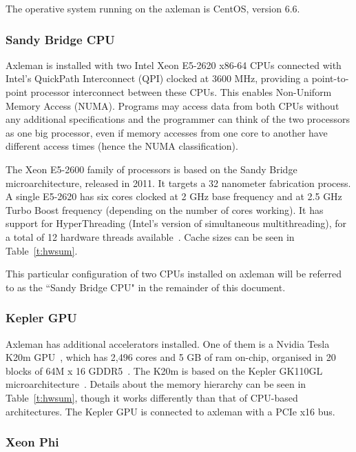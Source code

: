 The operative system running on the axleman is CentOS, version 6.6.

\subsubsection{Sandy Bridge CPU}

Axleman is installed with two Intel Xeon E5-2620 x86-64 CPUs connected with Intel's QuickPath Interconnect (QPI) clocked at 3600 MHz, providing a point-to-point processor interconnect between these CPUs. This enables Non-Uniform Memory Access (NUMA). Programs may access data from both CPUs without any additional specifications and the programmer can think of the two processors as one big processor, even if memory accesses from one core to another have different access times (hence the NUMA classification).

The Xeon E5-2600 family of processors is based on the Sandy Bridge microarchitecture, released in 2011. It targets a 32 nanometer fabrication process. A single E5-2620 has six cores clocked at 2 GHz base frequency and at 2.5 GHz Turbo Boost frequency (depending on the number of cores working). It has support for HyperThreading (Intel's version of simultaneous multithreading), for a total of 12 hardware threads available~\cite{1_cpu-world.com_2015}. Cache sizes can be seen in Table~\ref{t:hwsum}.

This particular configuration of two CPUs installed on axleman will be referred to as the ``Sandy Bridge CPU" in the remainder of this document.

\subsubsection{Kepler GPU}

Axleman has additional accelerators installed. One of them is a Nvidia Tesla K20m GPU~\cite{6_gpuzoo.com_2015}, which has 2,496 cores and 5 GB of ram on-chip, organised in 20 blocks of 64M x 16 GDDR5~\cite{Nvidia2013}. The K20m is based on the Kepler GK110GL microarchitecture~\cite{Nvidia2012}. Details about the memory hierarchy can be seen in Table~\ref{t:hwsum}, though it works differently than that of CPU-based architectures. The Kepler GPU is connected to axleman with a PCIe x16 bus.

\subsubsection{Xeon Phi}

